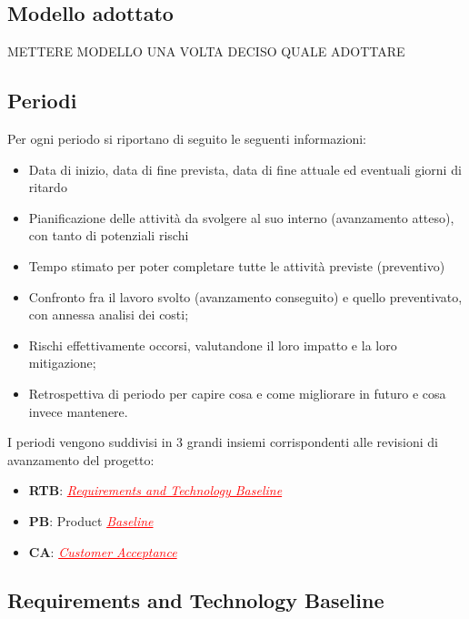 \documentclass[italian,12pt]{article} %
\begin{document}
\subsection{Modello adottato}
METTERE MODELLO UNA VOLTA DECISO QUALE ADOTTARE

\subsection{Periodi}
Per ogni periodo si riportano di seguito le seguenti informazioni:
\begin{itemize}
    \item Data di inizio, data di fine prevista, data di fine attuale ed eventuali giorni di ritardo
    \item Pianificazione delle attività da svolgere al suo interno (avanzamento atteso), con tanto di potenziali rischi
    \item Tempo stimato per poter completare tutte le attività previste (preventivo)
    \item Confronto fra il lavoro svolto (avanzamento conseguito) e quello preventivato, con annessa analisi dei costi;
    \item Rischi effettivamente occorsi, valutandone il loro impatto e la loro mitigazione;
    \item Retrospettiva di periodo per capire cosa e come migliorare in futuro e cosa invece mantenere.
\end{itemize}
I periodi vengono suddivisi in 3 grandi insiemi corrispondenti alle revisioni di avanzamento del progetto:
\begin{itemize}
    \item \textbf{RTB}: \textcolor{red}{\uline{\textit{Requirements and Technology Baseline}}}
    \item \textbf{PB}:  Product \textcolor{red}{\uline{\textit{Baseline}}}
    \item \textbf{CA}:  \textcolor{red}{\uline{\textit{Customer Acceptance}}}
\end{itemize}

\subsection{Requirements and Technology Baseline}
\end{document}
